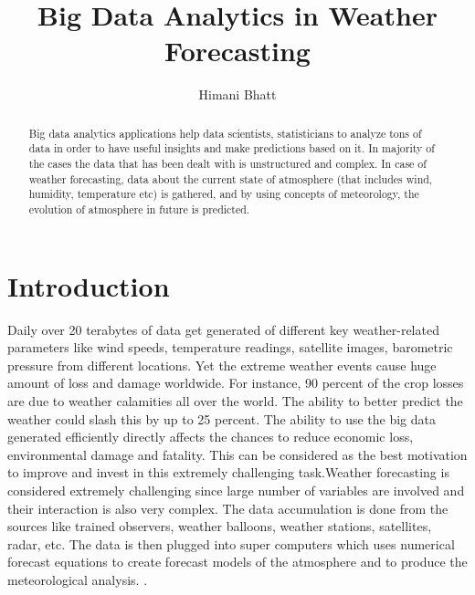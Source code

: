 \documentclass[sigconf]{acmart}
\begin{document}
\title{Big Data Analytics in Weather Forecasting}


\author{Himani Bhatt}



\renewcommand{\shortauthors}{H. Bhatt}



\begin{abstract}

Big data analytics applications help data scientists, statisticians to analyze tons of data in order to have useful insights and make predictions based on it. In majority of the cases the data that has been dealt with is unstructured and complex. In case of weather forecasting, data about the current state of atmosphere (that includes wind, humidity, temperature etc) is gathered, and by using concepts of meteorology, the evolution of atmosphere in future is predicted.

\end{abstract}


\maketitle

\section{Introduction} 

Daily over 20 terabytes of data get generated of different key weather-related parameters like wind speeds, temperature readings, satellite images, barometric pressure from different locations. Yet the extreme weather events cause huge amount of loss and damage worldwide. For instance, 90 percent of the crop losses are due to weather calamities all over the world. The ability to better predict the weather could slash this by up to 25 percent. The ability to use the big data generated efficiently directly affects the chances to reduce economic loss, environmental damage and fatality. This can be considered as the best motivation to improve and invest in this extremely challenging task.Weather forecasting is considered extremely challenging since large number of variables are involved and their interaction is also very complex.
The data accumulation is done from the sources like trained observers, weather balloons, weather stations, satellites, radar, etc. The data is then plugged into super computers which uses numerical forecast equations to create forecast models of the atmosphere and to produce the meteorological analysis.
\cite{Youtube}.
\end{document}
